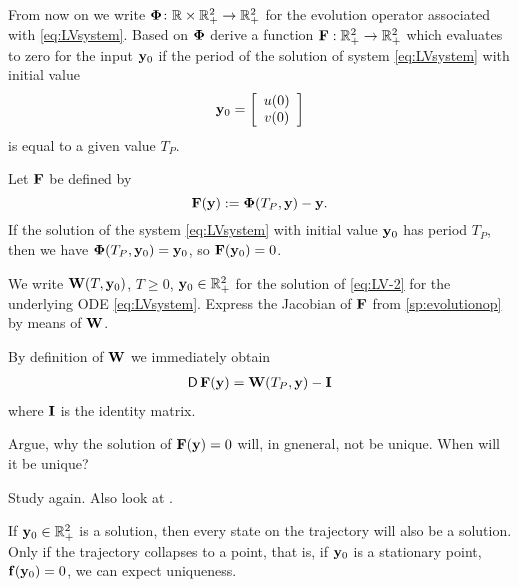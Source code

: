 \begin{problem}
\begin{subproblem}[1] \label{sp:evolutionop}
From now on we write $\mathbf{\Phi}\colon\mathbb{R}\times\mathbb{R}^2_+\to\mathbb{R}^2_+$ for the evolution operator associated with \eqref{eq:LVsystem}. Based on $\mathbf{\Phi}$ derive a function ${\mathbf{F}}: \mathbb{R}_+^2 \to \mathbb{R}_+^2$ which evaluates to zero for the input ${\mathbf{y}}_0$ if the period of the solution of system \eqref{eq:LVsystem} with initial value
\[
	{\mathbf{y}}_0=\left[\begin{array}{c}u(0)\\ v(0)\end{array}\right]
\]
is equal to a given value $T_P$. 
\begin{solution}
Let ${\mathbf{F}}$ be defined by 
\[
	{\mathbf{F}}({\mathbf{y}}) := \mathbf{\Phi}(T_P,{\mathbf{y}}) - {\mathbf{y}}.
\]
If the solution of the system \eqref{eq:LVsystem} with initial value $ {\mathbf{y}}_0$ has period $T_P$, then we have $\mathbf{\Phi}(T_P,{\mathbf{y}}_0) = {\mathbf{y}}_0$, so ${\mathbf{F}}({\mathbf{y}}_0) = 0$. 
\end{solution}
\end{subproblem}

\begin{subproblem}[1]
We write ${\mathbf{W}}(T,{\mathbf{y}}_0)$, $T\ge 0$, ${\mathbf{y}}_0\in\mathbb{R}^2_+$ for the solution of \eqref{eq:LV-2} for the underlying ODE  \eqref{eq:LVsystem}. Express the Jacobian of ${\mathbf{F}}$ from \ref{sp:evolutionop} by means of ${\mathbf{W}}$.
\begin{solution}
By definition of ${\mathbf{W}}$ we immediately obtain 
\begin{align*}
\operatorname{\sf D}{\mathbf{F}}({\mathbf{y}}) = {\mathbf{W}}(T_P,{\mathbf{y}})-{\mathbf{I}}
\end{align*}
where ${\mathbf{I}}$ is the identity matrix.
\end{solution}
\end{subproblem}

\begin{subproblem}[3]\label{sp:uniq}
  Argue, why the solution of ${\mathbf{F}}({\mathbf{y}})=0$ will, in gneneral, not be unique. 
  When will it be unique?

  \begin{hint}
    Study  again. Also look at . 
  \end{hint}

  \begin{solution}
    If {${\mathbf{y}}_{0}\in\mathbb{R}^{2}_{+}$} is a solution, then every state on the
    trajectory  will also be a solution. Only if the trajectory
    collapses to a point, that is, if ${\mathbf{y}}_{0}$ is a stationary point,
    ${\mathbf{f}}({\mathbf{y}}_{0})=0$, we can expect uniqueness.
  \end{solution}
\end{subproblem}


\end{problem}
